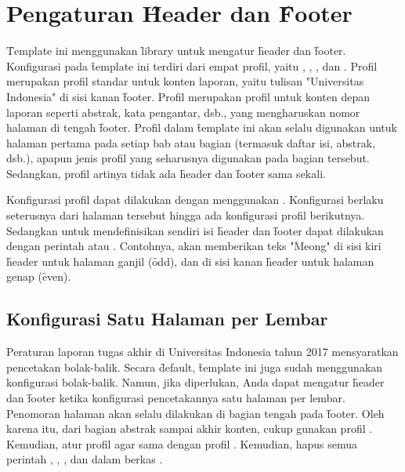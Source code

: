 \section{Pengaturan \f{Header} dan \f{Footer}}
\label{sec:fancyhdr}
\f{Template} ini menggunakan \f{library}  untuk mengatur \f{header} dan \f{footer}.
Konfigurasi  pada \f{template} ini terdiri dari empat profil, yaitu , , , dan .
Profil  merupakan profil standar untuk konten laporan, yaitu tulisan "Universitas Indonesia" di sisi kanan \f{footer}.
Profil  merupakan profil untuk konten depan laporan seperti abstrak, kata pengantar, dsb., yang mengharuskan nomor halaman di tengah \f{footer}.
Profil  dalam \f{template} ini akan selalu digunakan untuk halaman pertama pada setiap bab atau bagian (termasuk daftar isi, abstrak, dsb.), apapun jenis profil yang seharusnya digunakan pada bagian tersebut.
Sedangkan, profil  artinya tidak ada \f{header} dan \f{footer} sama sekali.

Konfigurasi profil dapat dilakukan dengan menggunakan .
Konfigurasi berlaku seterusnya dari halaman tersebut hingga ada konfigurasi profil berikutnya.
Sedangkan untuk mendefinisikan sendiri isi \f{header} dan \f{footer} dapat dilakukan dengan perintah  atau .
Contohnya,  akan memberikan teks "Meong" di sisi kiri \f{header} untuk halaman ganjil (\f{odd}), dan di sisi kanan \f{header} untuk halaman genap (\f{even}).

\subsection{Konfigurasi Satu Halaman per Lembar}
\label{sec:onePerSheet}
Peraturan laporan tugas akhir di Universitas Indonesia tahun 2017 mensyaratkan pencetakan bolak-balik.
Secara \f{default}, \f{template} ini juga sudah menggunakan konfigurasi bolak-balik.
Namun, jika diperlukan, Anda dapat mengatur \f{header} dan \f{footer} ketika konfigurasi pencetakannya satu halaman per lembar.
Penomoran halaman akan selalu dilakukan di bagian tengah pada \f{footer}.
Oleh karena itu, dari bagian abstrak sampai akhir konten, cukup gunakan profil .
Kemudian, atur profil  agar sama dengan profil .
Kemudian, hapus semua perintah , , , dan  dalam berkas .

